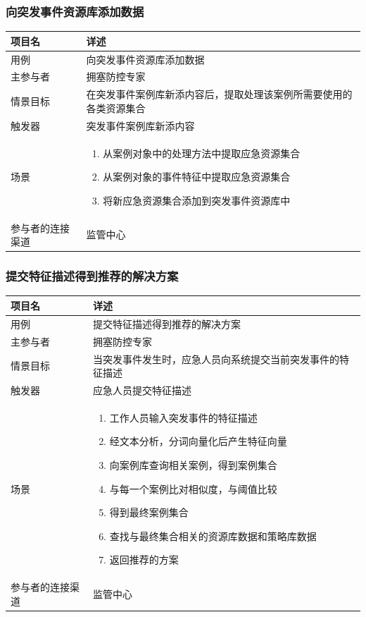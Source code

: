 \documentclass{ctexrep}
\begin{document}
\subsubsection{向突发事件资源库添加数据}
\begin{longtable}{p{2cm} | p{10cm}}
\hline
项目名 & 详述 \\
\hline
\hline
用例 & 向突发事件资源库添加数据\\
\hline
主参与者 & 拥塞防控专家\\
\hline
情景目标 & 在突发事件案例库新添内容后，提取处理该案例所需要使用的各类资源集合 \\
\hline
触发器 & 突发事件案例库新添内容\\
\hline
场景 & \begin{enumerate}
	\item 从案例对象中的处理方法中提取应急资源集合
	\item 从案例对象的事件特征中提取应急资源集合
	\item 将新应急资源集合添加到突发事件资源库中
\end{enumerate} \\
\hline
参与者的连接渠道 & 监管中心 \\
\hline
\end{longtable}

\subsubsection{提交特征描述得到推荐的解决方案}
\begin{longtable}{p{2cm} | p{10cm}}
\hline
项目名 & 详述 \\
\hline
\hline
用例 & 提交特征描述得到推荐的解决方案\\
\hline
主参与者 & 拥塞防控专家\\
\hline
情景目标 & 当突发事件发生时，应急人员向系统提交当前突发事件的特征描述 \\
\hline
触发器 & 应急人员提交特征描述\\
\hline
场景 & \begin{enumerate}
	\item 工作人员输入突发事件的特征描述
	\item 经文本分析，分词向量化后产生特征向量
	\item 向案例库查询相关案例，得到案例集合
	\item 与每一个案例比对相似度，与阈值比较
	\item 得到最终案例集合
	\item 查找与最终集合相关的资源库数据和策略库数据
	\item 返回推荐的方案
\end{enumerate} \\
\hline
参与者的连接渠道 & 监管中心 \\
\hline
\end{longtable}
\end{document}

